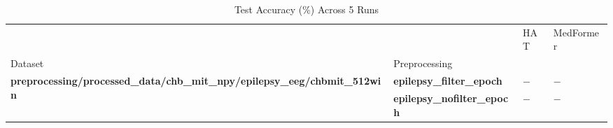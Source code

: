 \begin{table}
\caption{Test Accuracy (\%) Across 5 Runs}
\label{tab:results_acc}
\begin{tabular}{llll}
\toprule
 &  & HAT & MedFormer \\
Dataset & Preprocessing &  &  \\
\midrule
\multirow[t]{2}{*}{\textbf{preprocessing/processed_data/chb_mit_npy/epilepsy_eeg/chbmit_512win}} & \textbf{epilepsy_filter_epoch} & $-$ & $-$ \\
\textbf{} & \textbf{epilepsy_nofilter_epoch} & $-$ & $-$ \\
\cline{1-4}
\bottomrule
\end{tabular}
\end{table}
